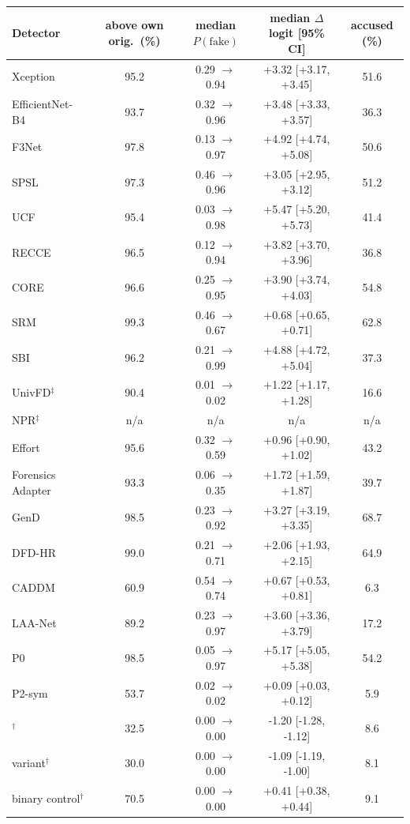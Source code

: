 \begin{tabular}{@{}l cccc@{}}
\toprule
Detector & above own orig.\ (\%) & median $P(\text{fake})$ & median $\Delta$logit [95\% CI] & accused (\%) \\
\midrule
Xception~\cite{xception} & 95.2 & 0.29 $\rightarrow$ 0.94 & +3.32 [+3.17, +3.45] & 51.6 \\
EfficientNet-B4~\cite{efficientnet} & 93.7 & 0.32 $\rightarrow$ 0.96 & +3.48 [+3.33, +3.57] & 36.3 \\
F3Net~\cite{f3net} & 97.8 & 0.13 $\rightarrow$ 0.97 & +4.92 [+4.74, +5.08] & 50.6 \\
SPSL~\cite{spsl} & 97.3 & 0.46 $\rightarrow$ 0.96 & +3.05 [+2.95, +3.12] & 51.2 \\
UCF~\cite{ucf} & 95.4 & 0.03 $\rightarrow$ 0.98 & +5.47 [+5.20, +5.73] & 41.4 \\
RECCE~\cite{recce} & 96.5 & 0.12 $\rightarrow$ 0.94 & +3.82 [+3.70, +3.96] & 36.8 \\
CORE~\cite{core} & 96.6 & 0.25 $\rightarrow$ 0.95 & +3.90 [+3.74, +4.03] & 54.8 \\
SRM~\cite{srm} & 99.3 & 0.46 $\rightarrow$ 0.67 & +0.68 [+0.65, +0.71] & 62.8 \\
SBI~\cite{sbi} & 96.2 & 0.21 $\rightarrow$ 0.99 & +4.88 [+4.72, +5.04] & 37.3 \\
UnivFD$^\ddagger$~\cite{univfd} & 90.4 & 0.01 $\rightarrow$ 0.02 & +1.22 [+1.17, +1.28] & 16.6 \\
NPR$^\ddagger$~\cite{npr} & n/a & n/a & n/a & n/a \\
Effort~\cite{effort} & 95.6 & 0.32 $\rightarrow$ 0.59 & +0.96 [+0.90, +1.02] & 43.2 \\
Forensics Adapter~\cite{forensicsadapter} & 93.3 & 0.06 $\rightarrow$ 0.35 & +1.72 [+1.59, +1.87] & 39.7 \\
GenD~\cite{gend2026} & 98.5 & 0.23 $\rightarrow$ 0.92 & +3.27 [+3.19, +3.35] & 68.7 \\
DFD-HR~\cite{dfdhr2026} & 99.0 & 0.21 $\rightarrow$ 0.71 & +2.06 [+1.93, +2.15] & 64.9 \\
CADDM~\cite{caddm} & 60.9 & 0.54 $\rightarrow$ 0.74 & +0.67 [+0.53, +0.81] & 6.3 \\
LAA-Net~\cite{laanet} & 89.2 & 0.23 $\rightarrow$ 0.97 & +3.60 [+3.36, +3.79] & 17.2 \\
\midrule
P0 & 98.5 & 0.05 $\rightarrow$ 0.97 & +5.17 [+5.05, +5.38] & 54.2 \\
P2-sym & 53.7 & 0.02 $\rightarrow$ 0.02 & +0.09 [+0.03, +0.12] & 5.9 \\
\ours{}$^\dagger$ & 32.5 & 0.00 $\rightarrow$ 0.00 & -1.20 [-1.28, -1.12] & 8.6 \\
\quad \ours{} variant$^\dagger$ & 30.0 & 0.00 $\rightarrow$ 0.00 & -1.09 [-1.19, -1.00] & 8.1 \\
binary control$^\dagger$ & 70.5 & 0.00 $\rightarrow$ 0.00 & +0.41 [+0.38, +0.44] & 9.1 \\
\bottomrule
\end{tabular}
